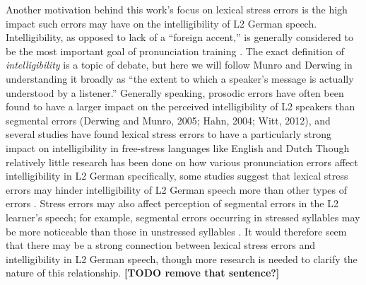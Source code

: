 \documentclass[a4paper]{article}
\newcommand{\TODO}[1]{{\color{red}\textbf{[TODO #1]}}}
\begin{document}
	
	
	Another motivation behind this work's focus on lexical stress errors is the high impact such errors may have on the intelligibility of L2 German speech.
	Intelligibility, as opposed to lack of a “foreign accent,” is generally considered to be the most important goal of pronunciation training \cite{Munro1999,Neri2002,Derwing2005,Field2005,Witt2012}. The exact definition of \textit{intelligibility} is a topic of debate,
	but here we will follow Munro and Derwing \cite[p.~289]{Munro1999} in understanding it broadly as ``the extent to which a speaker’s message is actually understood by a listener.''
	Generally speaking, prosodic errors have often been found to have a larger impact on the perceived intelligibility of L2 speakers than segmental errors (Derwing and Munro, 2005; Hahn, 2004; Witt, 2012), and several studies have found lexical stress errors to have a particularly strong impact on intelligibility in free-stress languages like English and Dutch \cite{Cutler2005,Field2005} 
	Though relatively little research has been done on how various pronunciation errors affect intelligibility in L2 German specifically, some studies suggest that 
	lexical stress errors 
	may hinder intelligibility of L2 German speech more than other types of errors \cite{Hirschfeld1994,Hirschfeld2007}.
	Stress errors may also affect perception of segmental errors in the L2 learner’s speech; for example, segmental errors occurring in stressed syllables may be more noticeable than those in unstressed syllables \cite{Cutler2005,Michaux2012}. 
	It would therefore seem that there may be a strong connection between lexical stress errors and intelligibility in L2 German speech, though more research is needed to clarify the nature of this relationship. \TODO{remove that sentence?}
	
\end{document}
